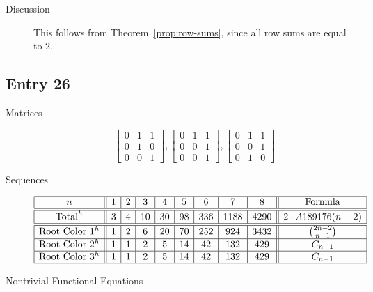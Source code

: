 \documentclass[12pt]{amsart}
\begin{document}
\begin{description}
    
    \item[Discussion] This follows from Theorem~\ref{prop:row-sums}, since all row sums are equal to $2$.
\end{description}

\subsection*{Entry 26}
\begin{description}
    \item[Matrices]
    
    \[\begin{bmatrix}
0 & 1 & 1 \\
0 & 1 & 0 \\
0 & 0 & 1
\end{bmatrix}, \begin{bmatrix}
0 & 1 & 1 \\
0 & 0 & 1 \\
0 & 0 & 1
\end{bmatrix}, \begin{bmatrix}
0 & 1 & 1 \\
0 & 0 & 1 \\
0 & 1 & 0
\end{bmatrix}\]
    \item[Sequences]\hspace*{\fill}\vspace{-0.5cm}
    \begin{center}
        \[
        \begin{array}{|c||c|c|c|c|c|c|c|c||c|}\hline
           n  & 1 & 2 & 3 & 4 & 5 & 6 & 7 & 8  & \text{Formula}\\\hline\hline
           \text{Total}^{h}  & 3 & 4 & 10 & 30 & 98 & 336 & 1188 & 4290 & 2\cdot A189176(n-2)\\\hline\hline
           \text{Root Color }1^h & 1 & 2 & 6 & 20 & 70 & 252 & 924 & 3432 & \binom{2n-2}{n-1}\\\hline
           \text{Root Color }2^h & 1 & 1 & 2 & 5 & 14 & 42 & 132 & 429 & C_{n-1}\\\hline
           \text{Root Color }3^h & 1 & 1 & 2 & 5 & 14 & 42 & 132 & 429 & C_{n-1}\\\hline
        \end{array}
        \]
    \end{center}
    
    \item[Nontrivial Functional Equations]\hspace*{\fill}


\end{description}
\end{document}
